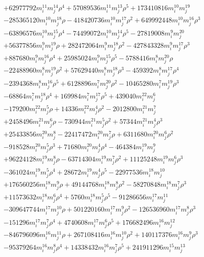 {\begin{align*}
&+62977792m_i^{11}m_j^{14}\rho^{4}+57089536m_i^{11}m_j^{13}\rho^{5}+173410816m_i^{10}m_j^{19}\\
&-285365120m_i^{10}m_j^{18}\rho-418420736m_i^{10}m_j^{17}\rho^{2}+649992448m_i^{10}m_j^{16}\rho^{3}\\
&-63896576m_i^{10}m_j^{15}\rho^{4}-74499072m_i^{10}m_j^{14}\rho^{5}-27819008m_i^{9}m_j^{20}\\
&+56377856m_i^{9}m_j^{19}\rho+282472064m_i^{9}m_j^{18}\rho^{2}-427843328m_i^{9}m_j^{17}\rho^{3}\\
&+887680m_i^{9}m_j^{16}\rho^{4}+25985024m_i^{9}m_j^{15}\rho^{5}-5788416m_i^{8}m_j^{20}\rho\\
&-22488960m_i^{8}m_j^{19}\rho^{2}+57629440m_i^{8}m_j^{18}\rho^{3}-459392m_i^{8}m_j^{17}\rho^{4}\\
&-2394368m_i^{8}m_j^{16}\rho^{5}+6128896m_i^{7}m_j^{20}\rho^{2}-10465280m_i^{7}m_j^{19}\rho^{3}\\
&-68864m_i^{7}m_j^{18}\rho^{4}+169984m_i^{7}m_j^{17}\rho^{5}+439040m_i^{22}m_j^{6}\\
&-179200m_i^{22}m_j^{5}\rho+14336m_i^{22}m_j^{4}\rho^{2}-2012800m_i^{21}m_j^{7}\\
&+2458496m_i^{21}m_j^{6}\rho-730944m_i^{21}m_j^{5}\rho^{2}+57344m_i^{21}m_j^{4}\rho^{3}\\
&+25433856m_i^{20}m_j^{8}-22417472m_i^{20}m_j^{7}\rho+6311680m_i^{20}m_j^{6}\rho^{2}\\
&-918528m_i^{20}m_j^{5}\rho^{3}+71680m_i^{20}m_j^{4}\rho^{4}-464384m_i^{19}m_j^{9}\\
&+96224128m_i^{19}m_j^{8}\rho-63714304m_i^{19}m_j^{7}\rho^{2}+11125248m_i^{19}m_j^{6}\rho^{3}\\
&-361024m_i^{19}m_j^{5}\rho^{4}+28672m_i^{19}m_j^{4}\rho^{5}-22977536m_i^{18}m_j^{10}\\
&+176560256m_i^{18}m_j^{9}\rho+49144768m_i^{18}m_j^{8}\rho^{2}-58270848m_i^{18}m_j^{7}\rho^{3}\\
&+11573632m_i^{18}m_j^{6}\rho^{4}+5760m_i^{18}m_j^{5}\rho^{5}-91286656m_i^{17}m_j^{11}\\
&-309647744m_i^{17}m_j^{10}\rho+501220160m_i^{17}m_j^{9}\rho^{2}-126536960m_i^{17}m_j^{8}\rho^{3}\\
&-151296m_i^{17}m_j^{7}\rho^{4}+4740608m_i^{17}m_j^{6}\rho^{5}+176682496m_i^{16}m_j^{12}\\
&-846796096m_i^{16}m_j^{11}\rho+267108416m_i^{16}m_j^{10}\rho^{2}+140117376m_i^{16}m_j^{9}\rho^{3}\\
&-95379264m_i^{16}m_j^{8}\rho^{4}+14338432m_i^{16}m_j^{7}\rho^{5}+241911296m_i^{15}m_j^{13}\\

\end{align*}}
